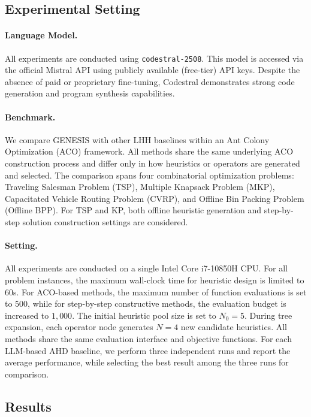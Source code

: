 \documentclass[sigconf,anonymous]{aamas}
\begin{document}
\subsection{Experimental Setting}

\paragraph{Language Model.}
All experiments are conducted using \texttt{codestral-2508}. This model is accessed via the official Mistral API using publicly available (free-tier) API keys. Despite the absence of paid or proprietary fine-tuning, Codestral demonstrates strong code generation and program synthesis capabilities.
\paragraph{Benchmark.}We compare GENESIS with other LHH baselines within an Ant Colony Optimization (ACO) framework. All methods share the same underlying ACO construction process and differ only in how heuristics or operators are generated and selected. The comparison spans four combinatorial optimization problems:
Traveling Salesman Problem (TSP), Multiple Knapsack Problem
(MKP), Capacitated Vehicle Routing Problem (CVRP), and Offline Bin Packing
Problem (Offline BPP). For TSP and KP, both offline heuristic generation and step-by-step solution construction settings are considered.
\paragraph{Setting.} All experiments are conducted on a single Intel Core i7-10850H CPU. For all problem instances, the maximum wall-clock time for heuristic
design is limited to $60$s. For ACO-based methods, the maximum number of function evaluations is set to $500$, while for step-by-step constructive methods, the evaluation budget is increased to $1{,}000$. The initial heuristic pool size is set to $N_0 = 5$.
During tree expansion, each operator node generates $N = 4$ new candidate heuristics. All methods share the same evaluation interface and objective functions. For each LLM-based AHD baseline, we perform three independent runs and
report the average performance, while selecting the best result among
the three runs for comparison.

\subsection{Results}
\end{document}
